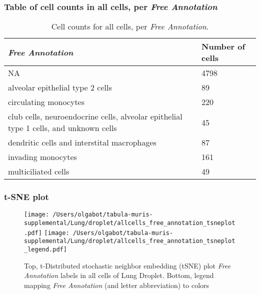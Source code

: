 \subsubsection{Table of cell counts in all cells, per \emph{Free Annotation}}\begin{table}[h]
\centering
\label{my-label}
\begin{tabular}{@{}ll@{}}
\toprule

\emph{Free Annotation}& Number of cells \\ \midrule
NA & 4798 \\

alveolar epithelial type 2 cells & 89 \\

circulating monocytes & 220 \\

club cells, neuroendocrine cells, alveolar epithelial type 1 cells, and unknown cells & 45 \\

dendritic cells and interstital macrophages & 87 \\

invading monocytes & 161 \\

multiciliated cells & 49 \\
\bottomrule
\end{tabular}
\caption{Cell counts for all cells, per \emph{Free Annotation}.}
\end{table}

\clearpage
\subsubsection{t-SNE plot}
\begin{figure}[h]
\centering
\texttt{[image: /Users/olgabot/tabula-muris-supplemental/Lung/droplet/allcells\_free\_annotation\_tsneplot.pdf]}
\texttt{[image: /Users/olgabot/tabula-muris-supplemental/Lung/droplet/allcells\_free\_annotation\_tsneplot\_legend.pdf]}
\caption{Top, t-Distributed stochastic neighbor embedding (tSNE) plot  \emph{Free Annotation} labels in all cells of Lung Droplet. Bottom, legend mapping \emph{Free Annotation} (and letter abbreviation) to colors}
\end{figure}


\clearpage

